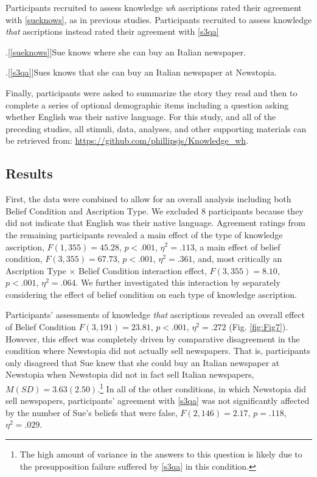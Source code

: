 \documentclass[a4paper]{article}
\begin{document}
Participants recruited to assess knowledge \textit{wh} ascriptions rated their agreement with \ref{sueknows}, as in previous studies. Participants recruited to assess knowledge \textit{that} ascriptions instead rated their agreement with \ref{s3qa}

\ex.[\ref{sueknows}]Sue knows where she can buy an Italian newspaper. 

\ex.[\ref{s3qa}]Sues knows that she can buy an Italian newspaper at Newstopia.

Finally, participants were asked to summarize the story they read and then to complete a series of optional demographic items including a question asking whether English was their native language. For this study, and all of the preceding studies, all stimuli, data, analyses, and other supporting materials can be retrieved from: \url{https://github.com/phillipsjs/Knowledge_wh}.

\subsection{Results}

First, the data were combined to allow for an overall analysis including both Belief Condition and Ascription Type. We excluded 8 participants because they did not indicate that English was their native language. Agreement ratings from the remaining participants revealed a main effect of the type of knowledge ascription, $F(1,355) = 45.28$, $p < .001$, $\eta^2 = .113$, a main effect of belief condition, $F(3,355) = 67.73$, $p < .001$, $\eta^2 = .361$, and, most critically an Ascription Type $\times$ Belief Condition interaction effect, $F(3,355) = 8.10$, $p < .001$, $\eta^2 = .064$. We further investigated this interaction by separately considering the effect of belief condition on each type of knowledge ascription. 

Participants' assessments of knowledge \textit{that} ascriptions revealed an overall effect of Belief Condition $F(3,191) = 23.81$, $p < .001$, $\eta^2 = .272$ (Fig. \ref{fig:Fig7}). However, this effect was completely driven by comparative disagreement in the condition where Newstopia did not actually sell newspapers. That is, participants only disagreed that Sue knew that she could buy an Italian newspaper at Newstopia when Newstopia did not in fact sell Italian newspapers, ${M}({SD}) = 3.63(2.50)$.\footnote{The high amount of variance in the answers to this question is likely due to the presupposition failure suffered by \ref{s3qa} in this condition.} In all of the other conditions, in which Newstopia did sell newspapers, participants' agreement with \ref{s3qa} was not significantly affected by the number of Sue's beliefs that were false, $F(2,146) = 2.17$, $p = .118$, $\eta^2 = .029$.
\end{document}
